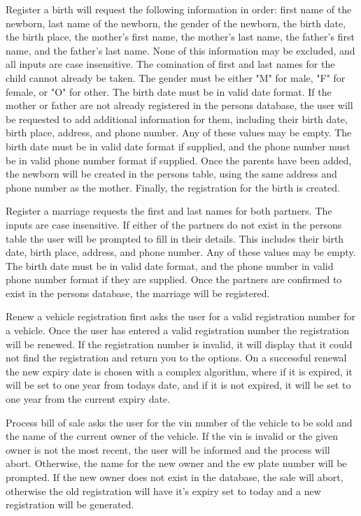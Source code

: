 Register a birth will request the following information in order: first name of
the newborn, last name of the newborn, the gender of the newborn, the birth
date, the birth place, the mother's first name, the mother's last name, the
father's first name, and the father's last name.  None of this information may
be excluded, and all inputs are case insensitive.  The comination of first and
last names for the child cannot already be taken.  The gender must be either
"M" for male, "F" for female, or "O" for other.  The birth date must be in
valid date format.  If the mother or father are not already registered in the
persons database, the user will be requested to add additional information for
them, including their birth date, birth place, address, and phone number.  Any
of these values may be empty.  The birth date must be in valid date format if
supplied, and the phone number must be in valid phone number format if supplied.
Once the parents have been added, the newborn will be created in the persons
table, using the same address and phone number as the mother.  Finally, the
registration for the birth is created.

Register a marriage requests the first and last names for both partners.  The
inputs are case insensitive.  If either of the partners do not exist in the
persons table the user will be prompted to fill in their details.  This includes
their birth date, birth place, address, and phone number.  Any of these values
may be empty.  The birth date must be in valid date format, and the phone number
in valid phone number format if they are supplied.  Once the partners are
confirmed to exist in the persons database, the marriage will be registered.

Renew a vehicle registration first asks the user for a valid registration
number for a vehicle. Once the user has entered a valid registration number the
registration will be renewed. If the registration number is invalid, it will
display that it could not find the registration and return you to the options.
On a successful renewal the new expiry date is chosen with a complex algorithm,
where if it is expired, it will be set to one year from todays date, and if it
is not expired, it will be set to one year from the current expiry date.

Process bill of sale asks the user for the vin number of the vehicle to be sold
and the name of the current owner of the vehicle. If the vin is invalid or the
given owner is not the most recent, the user will be informed and the process
will abort. Otherwise, the name for the new owner and the ew plate number will
be prompted. If the new owner does not exist in the database, the sale will
abort, otherwise the old registration will have it's expiry set to today and
a new registration will be generated.

